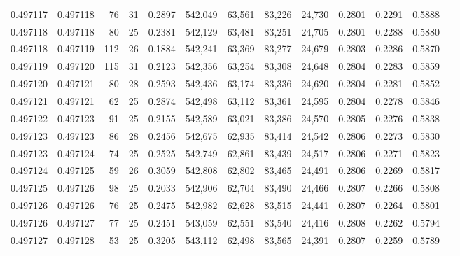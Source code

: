 \begin{tabular}{rrrrrrrrrrrrr}
0.497117 & 0.497118 &  76 &  31 &                                     0.2897 & 542,049 &  63,561 &  83,226 &  24,730 & 0.2801 & 0.2291 & 0.5888 \\
0.497118 & 0.497118 &  80 &  25 &                                     0.2381 & 542,129 &  63,481 &  83,251 &  24,705 & 0.2801 & 0.2288 & 0.5880 \\
0.497118 & 0.497119 & 112 &  26 &                                     0.1884 & 542,241 &  63,369 &  83,277 &  24,679 & 0.2803 & 0.2286 & 0.5870 \\
0.497119 & 0.497120 & 115 &  31 &                                     0.2123 & 542,356 &  63,254 &  83,308 &  24,648 & 0.2804 & 0.2283 & 0.5859 \\
0.497120 & 0.497121 &  80 &  28 &                                     0.2593 & 542,436 &  63,174 &  83,336 &  24,620 & 0.2804 & 0.2281 & 0.5852 \\
0.497121 & 0.497121 &  62 &  25 &                                     0.2874 & 542,498 &  63,112 &  83,361 &  24,595 & 0.2804 & 0.2278 & 0.5846 \\
0.497122 & 0.497123 &  91 &  25 &                                     0.2155 & 542,589 &  63,021 &  83,386 &  24,570 & 0.2805 & 0.2276 & 0.5838 \\
0.497123 & 0.497123 &  86 &  28 &                                     0.2456 & 542,675 &  62,935 &  83,414 &  24,542 & 0.2806 & 0.2273 & 0.5830 \\
0.497123 & 0.497124 &  74 &  25 &                                     0.2525 & 542,749 &  62,861 &  83,439 &  24,517 & 0.2806 & 0.2271 & 0.5823 \\
0.497124 & 0.497125 &  59 &  26 &                                     0.3059 & 542,808 &  62,802 &  83,465 &  24,491 & 0.2806 & 0.2269 & 0.5817 \\
0.497125 & 0.497126 &  98 &  25 &                                     0.2033 & 542,906 &  62,704 &  83,490 &  24,466 & 0.2807 & 0.2266 & 0.5808 \\
0.497126 & 0.497126 &  76 &  25 &                                     0.2475 & 542,982 &  62,628 &  83,515 &  24,441 & 0.2807 & 0.2264 & 0.5801 \\
0.497126 & 0.497127 &  77 &  25 &                                     0.2451 & 543,059 &  62,551 &  83,540 &  24,416 & 0.2808 & 0.2262 & 0.5794 \\
0.497127 & 0.497128 &  53 &  25 &                                     0.3205 & 543,112 &  62,498 &  83,565 &  24,391 & 0.2807 & 0.2259 & 0.5789 \\

\end{tabular}
